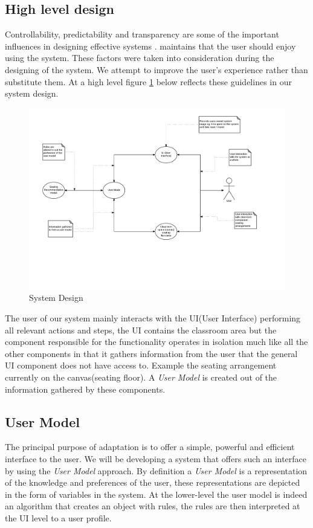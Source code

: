 \subsection{High level design}
Controllability, predictability and transparency are some of the important influences in designing effective systems \cite{hook1995glass}. \cite{rudisill1996human} maintains that the user should enjoy using the system. These factors were taken into consideration during the designing of the system. We attempt to improve the user's experience rather than substitute them. At a high level figure \ref{fig:SystemDesign} below reflects these guidelines in our system design.

\begin{figure}[!ht]
\caption{System Design}
    \label{fig:SystemDesign}
    \centering
    \includegraphics[scale=0.5]{figures/SystemDesign}
\end{figure}


The user of our system mainly interacts with the UI(User Interface) performing all relevant actions and steps, the UI contains the classroom area but the component responsible for the functionality operates in isolation much like all the other components in that it gathers information from the user that the general UI component does not have access to. Example the seating arrangement currently on the canvas(seating floor). A \emph{User Model} is created out of the information gathered by these components.

\subsection{User Model}
The principal purpose of adaptation is to offer a simple, powerful and efficient interface to the user. We will be developing a system that offers such an interface by using the \emph{User Model} approach. By definition a \emph{User Model} is a representation of the knowledge and preferences of the user, these representations are depicted in the form of variables in the system. At the lower-level the user model is indeed an algorithm that creates an object with rules, the rules are then interpreted at the UI level to a user profile.

